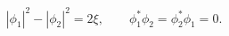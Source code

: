 \begin{equation}
  |\phi_1|^2-|\phi_2|^2 = 2\xi,  \qquad 
  \phi_1^*\phi_2 = \phi_2^*\phi_1 = 0.
\label{CFconst}
\end{equation}

